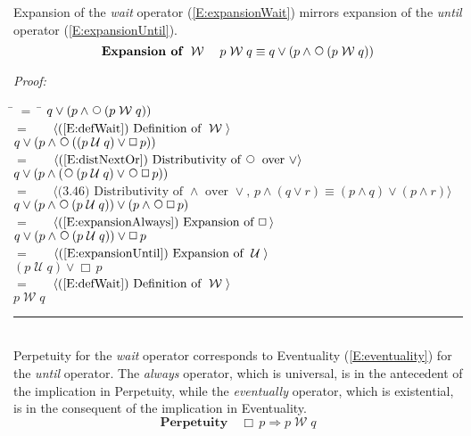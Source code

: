 \documentclass[fleqn, leqno]{article}
\newcommand{\lgap}{2pt}                             %
\newcommand{\mymathindent}{24pt}                    %
\newcommand{\Until}{\;\mathcal{U}\;}
\newcommand{\Wait}{\;\mathcal{W}\;}
\newcommand{\Next}{\;\,\text{\raisebox{3.5pt}{\circle{6}}}}
\newcommand{\Always}{\Box\,}
\newcommand{\myqed}{\hfill\rule[-.23ex]{1.2ex}{2.0ex}}
\newcommand{\Gll} {\langle}                         %
\newcommand{\Ggg} {\rangle}                         %
\newcommand{\Hint}[1]     {\ \ \ $\Gll              \mbox{#1} \Ggg$ }   %
\begin{document}
Expansion of the \textit{wait} operator (\ref{E:expansionWait}) mirrors expansion of the \textit{until} operator (\ref{E:expansionUntil}).
\begin{equation}\label{E:expansionWait}
\textbf{Expansion of $\Wait$}\quad p \Wait q \equiv q \lor (p \land \Next (p \Wait q))
\end{equation}

\emph{Proof:}
\begin{tabbing}
\hspace{\mymathindent} \= $= \;$ \= \kill
\> \> $q \lor (p \land \Next (p \Wait q))$\\[\lgap]
\> $=$ \> \Hint{(\ref{E:defWait}) Definition of $\Wait$} \\[\lgap]
\> \> $q \lor (p \land \Next ((p \Until q) \lor \Always p))$\\[\lgap]
\> $=$ \> \Hint{(\ref{E:distNextOr}) Distributivity of $\Next$ over $\lor$} \\[\lgap]
\> \> $q \lor (p \land (\Next (p \Until q) \lor \Next\Always p))$\\[\lgap]
\> $=$ \> \Hint{(3.46) Distributivity of $\land$ over $\lor$, $p\land (q\lor r)\equiv (p\land q)\lor (p\land r)$}\\[\lgap]
\> \> $q \lor (p \land \Next(p \Until q)) \lor (p \land \Next\Always p)$\\[\lgap]
\> $=$ \> \Hint{(\ref{E:expansionAlways}) Expansion of $\Always$}\\[\lgap]
\> \> $q \lor (p \land \Next(p \Until q)) \lor \Always p$\\[\lgap]
\> $=$ \> \Hint{(\ref{E:expansionUntil}) Expansion of $\Until$}\\[\lgap]
\> \> $(p \Until q) \lor \Always p$\\[\lgap]
\> $=$ \> \Hint{(\ref{E:defWait}) Definition of $\Wait$} \\[\lgap]
\> \> $p \Wait q$\\[\lgap]
\end{tabbing}
\myqed\\[\lgap]

Perpetuity for the \textit{wait} operator corresponds to Eventuality (\ref{E:eventuality})
for the \textit{until} operator.
The \textit{always} operator, which is universal, is in the antecedent of the implication in Perpetuity, while
the \textit{eventually} operator, which is existential, is in the consequent of the implication in Eventuality.
\begin{equation}\label{E:alwaysImpWait}
\textbf{Perpetuity}\quad \Always p \Rightarrow p \Wait q
\end{equation}
\end{document}
